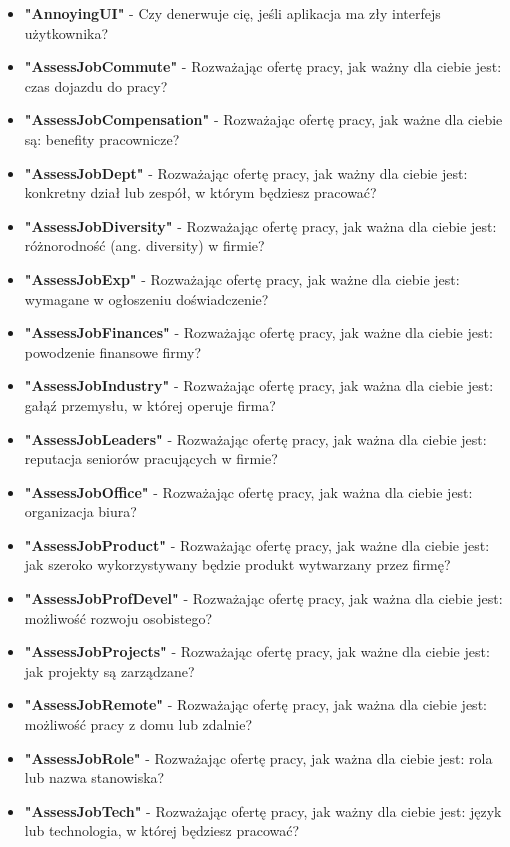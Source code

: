 \begin{appendices}
    \begin{itemize}
        \item \textbf{"AnnoyingUI"} - Czy denerwuje cię, jeśli aplikacja ma zły interfejs użytkownika?
        \item \textbf{"AssessJobCommute"} - Rozważając ofertę pracy, jak ważny dla ciebie jest: czas dojazdu do pracy?
        \item \textbf{"AssessJobCompensation"} - Rozważając ofertę pracy, jak ważne dla ciebie są: benefity pracownicze?
        \item \textbf{"AssessJobDept"} - Rozważając ofertę pracy, jak ważny dla ciebie jest: konkretny dział lub zespół, w którym będziesz pracować?
        \item \textbf{"AssessJobDiversity"} - Rozważając ofertę pracy, jak ważna dla ciebie jest: różnorodność (ang. diversity) w firmie?
        \item \textbf{"AssessJobExp"} - Rozważając ofertę pracy, jak ważne dla ciebie jest: wymagane w ogłoszeniu doświadczenie?
        \item \textbf{"AssessJobFinances"} - Rozważając ofertę pracy, jak ważne dla ciebie jest: powodzenie finansowe firmy?
        \item \textbf{"AssessJobIndustry"} - Rozważając ofertę pracy, jak ważna dla ciebie jest: gałąź przemysłu, w której operuje firma?
        \item \textbf{"AssessJobLeaders"} - Rozważając ofertę pracy, jak ważna dla ciebie jest: reputacja seniorów pracujących w firmie?
        \item \textbf{"AssessJobOffice"} - Rozważając ofertę pracy, jak ważna dla ciebie jest: organizacja biura?
        \item \textbf{"AssessJobProduct"} - Rozważając ofertę pracy, jak ważne dla ciebie jest: jak szeroko wykorzystywany będzie produkt wytwarzany przez firmę?
        \item \textbf{"AssessJobProfDevel"} - Rozważając ofertę pracy, jak ważna dla ciebie jest: możliwość rozwoju osobistego?
        \item \textbf{"AssessJobProjects"} - Rozważając ofertę pracy, jak ważne dla ciebie jest: jak projekty są zarządzane?
        \item \textbf{"AssessJobRemote"} - Rozważając ofertę pracy, jak ważna dla ciebie jest: możliwość pracy z domu lub zdalnie?
        \item \textbf{"AssessJobRole"} - Rozważając ofertę pracy, jak ważna dla ciebie jest: rola lub nazwa stanowiska?
        \item \textbf{"AssessJobTech"} - Rozważając ofertę pracy, jak ważny dla ciebie jest: język lub technologia, w której będziesz pracować?

\end{itemize}
\end{appendices}
